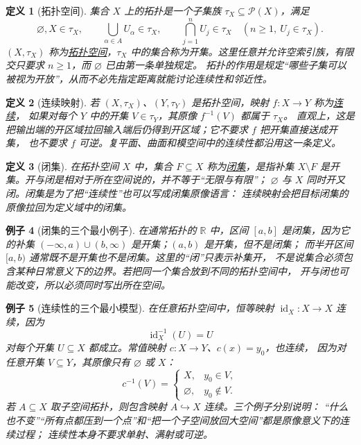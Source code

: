 \documentclass[UTF8,fontset=none,a4paper,11pt]{ctexart}
\theoremstyle{foundation-definition}
\newtheorem{definition}{定义}[section]
\theoremstyle{foundation-theorem}
\theoremstyle{foundation-proposition}
\theoremstyle{foundation-example}
\newtheorem{example}[definition]{例子}
\theoremstyle{foundation-remark}
\theoremstyle{foundation-theorem}
\newcommand{\term}[2]{\hyperref[#1]{#2}}
\begin{document}
\begin{definition}[拓扑空间]\label{def:topology}
集合 \(X\) 上的拓扑是一个子集族 \(\tau_X\subseteq\mathcal P(X)\)，满足
\[
\varnothing,X\in\tau_X,\qquad
\bigcup_{\alpha\in A}U_\alpha\in\tau_X,\qquad
\bigcap_{j=1}^{n}U_j\in\tau_X\quad(n\geq1,\ U_j\in\tau_X).
\]
\((X,\tau_X)\) 称为\term{def:topology}{拓扑空间}，\(\tau_X\) 中的集合称为开集。这里任意并允许空索引族，有限交只要求 \(n\geq1\)，而 \(\varnothing\) 已由第一条单独规定。
拓扑的作用是规定“哪些子集可以被视为开放”，从而不必先指定距离就能讨论连续性和邻近性。
\end{definition}

\begin{definition}[连续映射]\label{def:continuous-map}
若 \((X,\tau_X)\)、\((Y,\tau_Y)\) 是拓扑空间，映射 \(f:X\to Y\) 称为\term{def:continuous-map}{连续}，
如果对每个 \(Y\) 中的开集 \(V\in\tau_Y\)，其原像 \(f^{-1}(V)\) 都属于 \(\tau_X\)。
直观上，这是把输出端的开区域拉回输入端后仍得到开区域；它不要求 \(f\) 把开集直接送成开集，
也不要求 \(f\) 可逆。复平面、曲面和模空间中的连续性都沿用这一条定义。
\end{definition}

\begin{definition}[闭集]\label{def:closed-set}
在拓扑空间 \(X\) 中，集合 \(F\subseteq X\) 称为\term{def:closed-set}{闭集}，是指补集
\(X\setminus F\) 是开集。开与闭是相对于所在空间说的，并不等于“无限与有限”；
\(\varnothing\) 与 \(X\) 同时开又闭。闭集是为了把“连续性”也可以写成闭集原像语言：
连续映射会把目标闭集的原像拉回为定义域中的闭集。
\end{definition}

\begin{example}[闭集的三个最小例子]\label{ex:closed-set-basic}
在通常拓扑的 \(\mathbb R\) 中，区间 \([a,b]\) 是闭集，因为它的补集
 \((-\infty,a)\cup(b,\infty)\) 是开集；\((a,b)\) 是开集，但不是闭集；
而半开区间 \([a,b)\) 通常既不是开集也不是闭集。这里的“闭”只表示补集开，
不是说集合必须包含某种日常意义下的边界。若把同一个集合放到不同的拓扑空间中，
开与闭也可能改变，所以必须同时写出所在空间。
\end{example}

\begin{example}[连续性的三个最小模型]\label{ex:continuous-basic-models}
在任意拓扑空间中，恒等映射 \(\operatorname{id}_X:X\to X\) 连续，因为
\[
  \operatorname{id}_X^{-1}(U)=U
\]
对每个开集 \(U\subseteq X\) 都成立。常值映射 \(c:X\to Y\)、\(c(x)=y_0\)，也连续，
因为对任意开集 \(V\subseteq Y\)，其原像只有 \(\varnothing\) 或 \(X\)：
\[
  c^{-1}(V)=
  \begin{cases}
  X,&y_0\in V,\\
  \varnothing,&y_0\notin V.
  \end{cases}
\]
若 \(A\subseteq X\) 取子空间拓扑，则包含映射 \(A\hookrightarrow X\) 连续。三个例子分别说明：
“什么也不变”“所有点都压到一个点”和“把一个子空间放回大空间”都是原像意义下的连续过程；
连续性本身不要求单射、满射或可逆。
\end{example}
\end{document}
